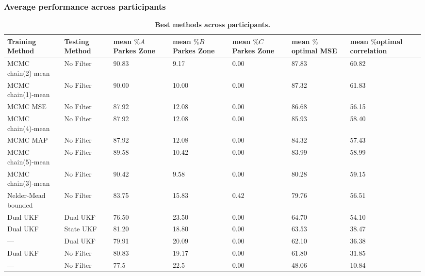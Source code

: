 \documentclass[10pt,letterpaper]{article}
\begin{document}
\subsubsection{Average performance across participants}
\begin{table}[!ht]
\begin{adjustwidth}{-2.25in}{0in} %
\caption{{\bf Best methods across participants.}}
\label{table:rankedTable}
\begin{tabular}{|l|l|p{1cm}|p{1cm}|p{1cm}|p{2cm}|p{2cm}|}
  \hline
Training Method & Testing Method & mean $\%A$ Parkes Zone & mean $\%B$ Parkes Zone & mean $\%C$ Parkes Zone & mean $\%$optimal MSE & mean $\%$optimal correlation \\ 
  \hline
  MCMC chain(2)-mean & No Filter & 90.83 & 9.17 & 0.00 & 87.83 & 60.82 \\ 
  MCMC chain(1)-mean & No Filter & 90.00 & 10.00 & 0.00 & 87.32 & 61.83 \\ 
  MCMC MSE & No Filter & 87.92 & 12.08 & 0.00 & 86.68 & 56.15 \\ 
  MCMC chain(4)-mean & No Filter & 87.92 & 12.08 & 0.00 & 85.93 & 58.40 \\ 
  MCMC MAP & No Filter & 87.92 & 12.08 & 0.00 & 84.32 & 57.43 \\ 
  MCMC chain(5)-mean & No Filter & 89.58 & 10.42 & 0.00 & 83.99 & 58.99 \\ 
  MCMC chain(3)-mean & No Filter & 90.42 & 9.58 & 0.00 & 80.28 & 59.15 \\ 
  Nelder-Mead bounded & No Filter & 83.75 & 15.83 & 0.42 & 79.76 & 56.51 \\ 
  Dual UKF & Dual UKF & 76.50 & 23.50 & 0.00 & 64.70 & 54.10 \\ 
  Dual UKF & State UKF & 81.20 & 18.80 & 0.00 & 63.53 & 38.47 \\ 
  --- & Dual UKF & 79.91 & 20.09 & 0.00 & 62.10 & 36.38 \\ 
  Dual UKF & No Filter & 80.83 & 19.17 & 0.00 & 61.80 & 31.85 \\ 
  --- & No Filter & 77.5 & 22.5 & 0.00 & 48.06 & 10.84 \\
  \hline
\end{tabular} \\

\end{adjustwidth}
\end{table}
\end{document}
